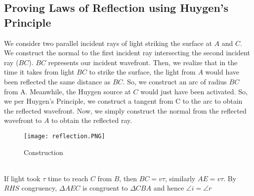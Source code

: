 \documentclass{article}
\begin{document}
\subsection{Proving Laws of Reflection using Huygen's Principle}
We consider two parallel incident rays of light striking the surface at $A$ and $C$. We construct the normal to the first incident ray intersecting the second incident ray ($BC$). $BC$ represents our incident wavefront. Then, we realize that in the time it takes from light $BC$ to strike the surface, the light from $A$ would have been reflected the same distance as $BC$. So, we construct an arc of radius $BC$ from A. Meanwhile, the Huygen source at $C$ would just have been activated. So, we per Huygen's Principle, we construct a tangent from C to the arc to obtain the reflected wavefront. Now, we simply construct the normal from the reflected wavefront to $A$ to obtain the reflected ray. \newline \\
\begin{figure}[htp]
    \centering
    \texttt{[image: reflection.PNG]}
    \caption{Construction}
    \label{fig:galaxy}
\end{figure}\\
If light took $\tau$ time to reach $C$ from $B$, then $BC = v\tau$, similarly $AE = v\tau$. By $RHS$ congruency, $\Delta AEC$ is congruent to $\Delta CBA$ and hence $\angle i = \angle r$
\end{document}

